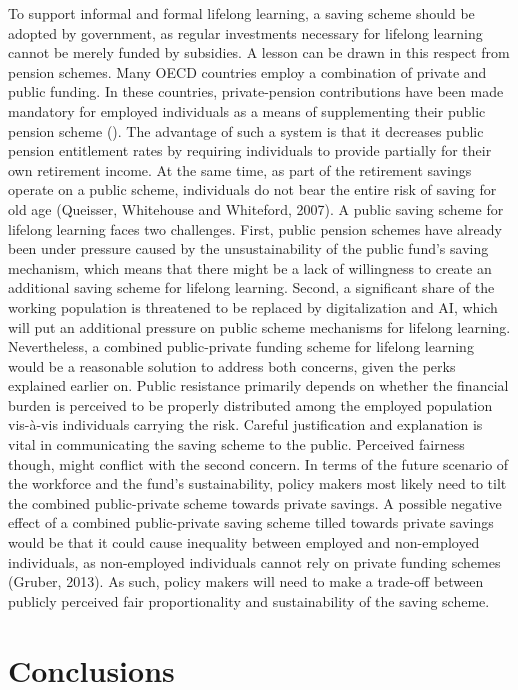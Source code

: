 To support informal and formal lifelong learning, a saving scheme should be adopted by government, as regular investments necessary for lifelong learning cannot be merely funded by subsidies. A lesson can be drawn in this respect from pension schemes. Many OECD countries employ a combination of private and public funding. In these countries, private-pension contributions have been made mandatory for employed individuals as a means of supplementing their public pension scheme (\citealt{antolin2009filling}). The advantage of such a system is that it decreases public pension entitlement rates by requiring individuals to provide partially for their own retirement income. At the same time, as part of the retirement savings operate on a public scheme, individuals do not bear the entire risk of saving for old age (Queisser, Whitehouse and Whiteford, 2007). A public saving scheme for lifelong learning faces two challenges. First, public pension schemes have already been under pressure caused by the unsustainability of the public fund’s saving mechanism, which means that there might be a lack of willingness to create an additional saving scheme for lifelong learning. Second, a significant share of the working population is threatened to be replaced by digitalization and AI, which will put an additional pressure on public scheme mechanisms for lifelong learning. Nevertheless, a combined public-private funding scheme for lifelong learning would be a reasonable solution to address both concerns, given the perks explained earlier on. Public resistance primarily depends on whether the financial burden is perceived to be properly distributed among the employed population vis-à-vis individuals carrying the risk. Careful justification and explanation is vital in communicating the saving scheme to the public. Perceived fairness though, might conflict with the second concern. In terms of the future scenario of the workforce and the fund’s sustainability, policy makers most likely need to tilt the combined public-private scheme towards private savings. A possible negative effect of a combined public-private saving scheme tilled towards private savings would be that it could cause inequality between employed and non-employed individuals, as non-employed individuals cannot rely on private funding schemes (Gruber, 2013). As such, policy makers will need to make a trade-off between publicly perceived fair proportionality and sustainability of the saving scheme. 

\section*{Conclusions}

